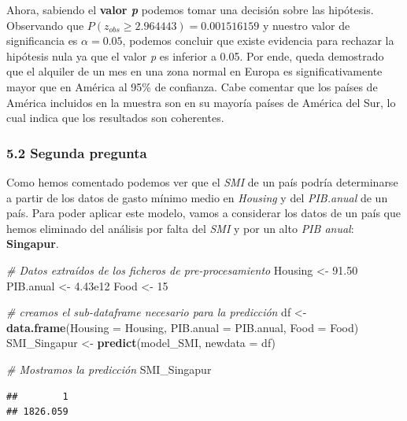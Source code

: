 \documentclass[
]{article}
\newenvironment{Shaded}{\begin{snugshade}}{\end{snugshade}}
\newcommand{\AttributeTok}[1]{\textcolor[rgb]{0.13,0.29,0.53}{#1}}
\newcommand{\CommentTok}[1]{\textcolor[rgb]{0.56,0.35,0.01}{\textit{#1}}}
\newcommand{\DecValTok}[1]{\textcolor[rgb]{0.00,0.00,0.81}{#1}}
\newcommand{\FloatTok}[1]{\textcolor[rgb]{0.00,0.00,0.81}{#1}}
\newcommand{\FunctionTok}[1]{\textcolor[rgb]{0.13,0.29,0.53}{\textbf{#1}}}
\newcommand{\NormalTok}[1]{#1}
\newcommand{\OtherTok}[1]{\textcolor[rgb]{0.56,0.35,0.01}{#1}}
\begin{document}
Ahora, sabiendo el \textbf{valor \emph{p}} podemos tomar una decisión
sobre las hipótesis. Observando que
\(P(z_{obs}≥2.964443) = 0.001516159\) y nuestro valor de significancia
es \(\alpha = 0.05\), podemos concluir que existe evidencia para
rechazar la hipótesis nula ya que el valor \emph{p} es inferior a 0.05.
Por ende, queda demostrado que el alquiler de un mes en una zona normal
en Europa es significativamente mayor que en América al 95\% de
confianza. Cabe comentar que los países de América incluidos en la
muestra son en su mayoría países de América del Sur, lo cual indica que
los resultados son coherentes.

\hypertarget{segunda-pregunta}{%
\subsubsection{5.2 Segunda pregunta}\label{segunda-pregunta}}

Como hemos comentado podemos ver que el \emph{SMI} de un país podría
determinarse a partir de los datos de gasto mínimo medio en
\emph{Housing} y del \emph{PIB.anual} de un país. Para poder aplicar
este modelo, vamos a considerar los datos de un país que hemos eliminado
del análisis por falta del \emph{SMI} y por un alto \emph{PIB anual}:
\textbf{Singapur}.

\begin{Shaded}
\begin{Highlighting}[]
\CommentTok{\# Datos extraídos de los ficheros de pre{-}procesamiento}
\NormalTok{Housing }\OtherTok{\textless{}{-}} \FloatTok{91.50}
\NormalTok{PIB.anual }\OtherTok{\textless{}{-}} \FloatTok{4.43e12}
\NormalTok{Food }\OtherTok{\textless{}{-}} \DecValTok{15}

\CommentTok{\# creamos el sub{-}dataframe necesario para la predicción}
\NormalTok{df }\OtherTok{\textless{}{-}} \FunctionTok{data.frame}\NormalTok{(}\AttributeTok{Housing =}\NormalTok{ Housing, }\AttributeTok{PIB.anual =}\NormalTok{ PIB.anual, }\AttributeTok{Food =}\NormalTok{ Food)}
\NormalTok{SMI\_Singapur }\OtherTok{\textless{}{-}} \FunctionTok{predict}\NormalTok{(model\_SMI, }\AttributeTok{newdata =}\NormalTok{ df)}

\CommentTok{\# Mostramos la predicción}
\NormalTok{SMI\_Singapur}
\end{Highlighting}
\end{Shaded}

\begin{verbatim}
##        1 
## 1826.059
\end{verbatim}
\end{document}
